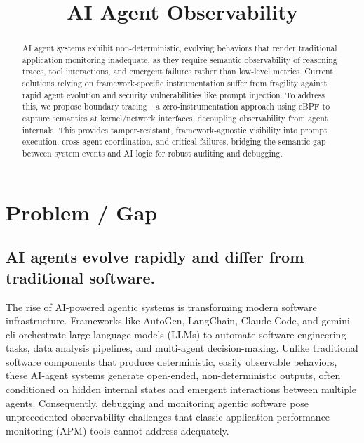 \documentclass[sigplan,screen，review,9pt]{acmart}
\begin{document}
\title{AI Agent Observability}


\author{}


\sloppy
\begin{abstract}
AI agent systems exhibit non-deterministic, evolving behaviors that render traditional application monitoring inadequate, as they require semantic observability of reasoning traces, tool interactions, and emergent failures rather than low-level metrics. Current solutions relying on framework-specific instrumentation suffer from fragility against rapid agent evolution and security vulnerabilities like prompt injection. To address this, we propose boundary tracing—a zero-instrumentation approach using eBPF to capture semantics at kernel/network interfaces, decoupling observability from agent internals. This provides tamper-resistant, framework-agnostic visibility into prompt execution, cross-agent coordination, and critical failures, bridging the semantic gap between system events and AI logic for robust auditing and debugging.
\end{abstract}


\maketitle



\section{Problem / Gap}

\subsection*{AI agents evolve rapidly and differ from traditional software.}  
The rise of AI-powered agentic systems is transforming modern software infrastructure. Frameworks like AutoGen, LangChain, Claude Code, and gemini-cli orchestrate large language models (LLMs) to automate software engineering tasks, data analysis pipelines, and multi-agent decision-making. Unlike traditional software components that produce deterministic, easily observable behaviors, these AI-agent systems generate open-ended, non-deterministic outputs, often conditioned on hidden internal states and emergent interactions between multiple agents. Consequently, debugging and monitoring agentic software pose unprecedented observability challenges that classic application performance monitoring (APM) tools cannot address adequately.
\end{document}
